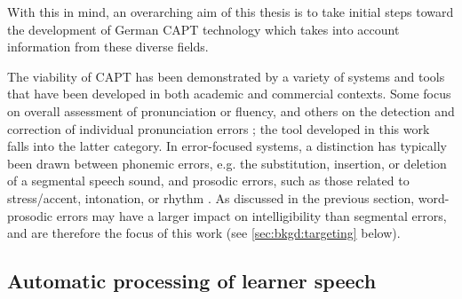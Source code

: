 With this in mind, an overarching aim of this thesis is to take initial steps toward the development of German CAPT technology which takes into account information from these diverse fields. 
%
%	
%
%
%	
%	
	\label{sec:capt:systems}
		
	The viability of CAPT has been demonstrated by a variety of systems and tools that have been developed in both academic and commercial contexts. Some focus on overall assessment of pronunciation or fluency, and others on the detection and correction of individual pronunciation errors \citep{Eskenazi2009}; the tool developed in this work falls into the latter category. In error-focused systems, a distinction has typically been drawn between phonemic errors, e.g. the substitution, insertion, or deletion of a segmental speech sound, and prosodic errors, such as those related to stress/accent, intonation, or rhythm \citep{Witt2012}. As discussed in the previous section, word-prosodic errors may have a larger impact on intelligibility than segmental errors, and are therefore the focus of this work (see \cref{sec:bkgd:targeting} below). 
	
	\subsection{Automatic processing of learner speech}
	\label{sec:capt:auto}
	
